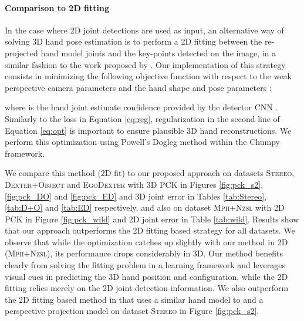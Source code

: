 \documentclass[10pt,twocolumn,letterpaper]{article}
\begin{document}
\paragraph{Comparison to 2D fitting}
\vspace{-10pt}
In the case where 2D joint detections are used as input, an alternative way of solving 3D hand pose estimation is to perform a 2D fitting between the re-projected hand model joints and the key-points detected on the image, in a similar fashion to the work proposed by \cite{panteleris2018using}. Our implementation of this strategy consists in minimizing the following objective function with respect to the weak perspective camera parameters  and the hand shape and pose parameters :

where  is the  hand joint estimate confidence provided by the detector CNN \cite{simon2017hand}. Similarly to the loss in Equation \ref{eq:reg}, regularization in the second line of Equation \ref{eq:opt} is important to ensure plausible 3D hand reconstructions. We perform this optimization using Powell's Dogleg method \cite{nocedal2006nonlinear} within the Chumpy \cite{chumpy} framework. 

We compare this method (2D fit) to our proposed approach on datasets \textsc{Stereo}, \textsc{Dexter+Object} and \textsc{EgoDexter} with 3D PCK in Figures \ref{fig:pck_s2}, \ref{fig:pck_DO} and \ref{fig:pck_ED} and 3D joint error in Tables \ref{tab:Stereo}, \ref{tab:D+O} and \ref{tab:ED} respectively, and also on dataset \textsc{Mpii+Nzsl} with 2D PCK in Figure \ref{fig:pck_wild} and 2D joint error in Table \ref{tab:wild}. Results show that our approach outperforms the 2D fitting based strategy for all datasets. We observe that while the optimization catches up slightly with our method in 2D (\textsc{Mpii+Nzsl}), its performance drops considerably in 3D. Our method benefits clearly from solving the fitting problem in a learning framework and leverages visual cues in predicting the 3D hand position and configuration, while the 2D fitting relies merely on the 2D joint detection information. We also outperform the 2D fitting based method in \cite{panteleris2018using} that uses a similar hand model to \cite{oikonomidis2011efficient} and a perspective projection model on dataset \textsc{Stereo} in Figure \ref{fig:pck_s2}. 
 
\end{document}

